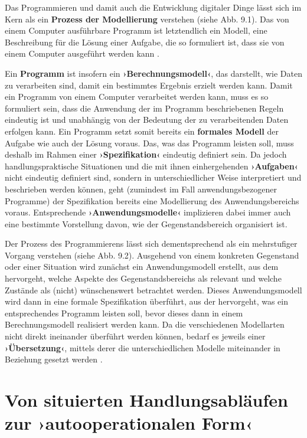 \documentclass[
  a4paper,
]{book}
\begin{document}
Das Programmieren und damit auch die Entwicklung digitaler Dinge lässt sich im Kern als ein \textbf{Prozess der Modellierung} verstehen (siehe {Abb. 9.1}). Das von einem Computer ausführbare Programm ist letztendlich ein Modell, eine Beschreibung für die Lösung einer Aufgabe, die so formuliert ist, dass sie von einem Computer ausgeführt werden kann \citep{floydModellierungHandgriffZur1998, humbertInformatikUbergreifendeEinzigartige2002, rechenbergInformatikHandbuch2002}.

Ein \textbf{Programm} ist insofern ein \textbf{›Berechnungsmodell‹}, das darstellt, wie Daten zu verarbeiten sind, damit ein bestimmtes Ergebnis erzielt werden kann. Damit ein Programm von einem Computer verarbeitet werden kann, muss es so formuliert sein, dass die Anwendung der im Programm beschriebenen Regeln eindeutig ist und unabhängig von der Bedeutung der zu verarbeitenden Daten erfolgen kann. Ein Programm setzt somit bereits ein \textbf{formales Modell} der Aufgabe wie auch der Lösung voraus. Das, was das Programm leisten soll, muss deshalb im Rahmen einer \textbf{›Spezifikation‹} eindeutig definiert sein. Da jedoch handlungspraktische Situationen und die mit ihnen einhergehenden \textbf{›Aufgaben‹} nicht eindeutig definiert sind, sondern in unterschiedlicher Weise interpretiert und beschrieben werden können, geht (zumindest im Fall anwendungsbezogener Programme) der Spezifikation bereits eine Modellierung des Anwendungsbereichs voraus. Entsprechende \textbf{›Anwendungsmodelle‹} implizieren dabei immer auch eine bestimmte Vorstellung davon, wie der Gegenstandsbereich organisiert ist.

Der Prozess des Programmierens lässt sich dementsprechend als ein mehrstufiger Vorgang verstehen (siehe {Abb. 9.2}). Ausgehend von einem konkreten Gegenstand oder einer Situation wird zunächst ein Anwendungsmodell erstellt, aus dem hervorgeht, welche Aspekte des Gegenstandsbereichs als relevant und welche Zustände als (nicht) wünschenswert betrachtet werden. Dieses Anwendungsmodell wird dann in eine formale Spezifikation überführt, aus der hervorgeht, was ein entsprechendes Programm leisten soll, bevor dieses dann in einem Berechnungsmodell realisiert werden kann. Da die verschiedenen Modellarten nicht direkt ineinander überführt werden können, bedarf es jeweils einer \textbf{›Übersetzung‹}, mittels derer die unterschiedlichen Modelle miteinander in Beziehung gesetzt werden \citep[siehe hierzu ausführlicher][]{haeusslingZurRolleEntwuerfen2016}.

\section{Von situierten Handlungsabläufen zur ›autooperationalen Form‹}\label{von-situierten-handlungsabluxe4ufen-zur-autooperationalen-form}
\end{document}
